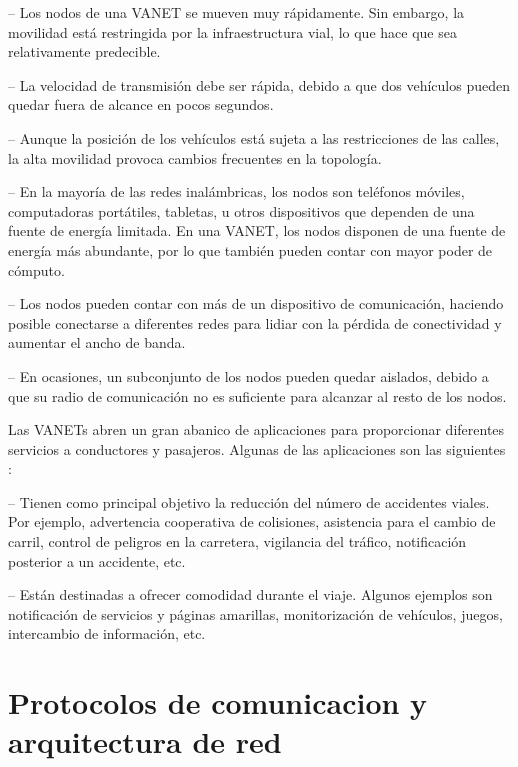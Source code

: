  -- Los nodos de una VANET se mueven muy rápidamente. Sin
embargo, la movilidad está restringida por la infraestructura vial, lo que hace
que sea relativamente predecible.

 -- La velocidad de transmisión debe ser
rápida, debido a que dos vehículos pueden quedar fuera de alcance en pocos
segundos.

 -- Aunque la posición de los vehículos está sujeta a las
restricciones de las calles, la alta movilidad provoca cambios frecuentes en
la topología.

 -- En la mayoría de las redes inalámbricas, los nodos son
teléfonos móviles, computadoras portátiles, tabletas, u otros dispositivos que
dependen de una fuente de energía limitada. En una VANET, los nodos disponen de
una fuente de energía más abundante, por lo que también pueden contar con mayor
poder de cómputo.

 -- Los nodos pueden contar con más de un dispositivo de
comunicación, haciendo posible conectarse a diferentes redes  para lidiar con la
pérdida de conectividad y aumentar el ancho de banda.

 -- En ocasiones, un subconjunto de los nodos
pueden quedar aislados, debido a que su radio de comunicación no es suficiente
para alcanzar al resto de los nodos.

Las VANETs abren un gran abanico de aplicaciones para proporcionar diferentes
servicios a conductores y pasajeros. Algunas de las aplicaciones son las
siguientes \cite{Meneguette2018}:

 -- Tienen como principal objetivo la
reducción del número de accidentes viales. Por ejemplo, advertencia cooperativa
de colisiones, asistencia para el cambio de carril, control de peligros en la
carretera, vigilancia del tráfico, notificación posterior a un accidente, etc.

 -- Están destinadas a ofrecer comodidad
durante el viaje. Algunos ejemplos son notificación de servicios y páginas
amarillas, monitorización de vehículos, juegos, intercambio de información,
etc.

\section{Protocolos de comunicacion y arquitectura de red}

